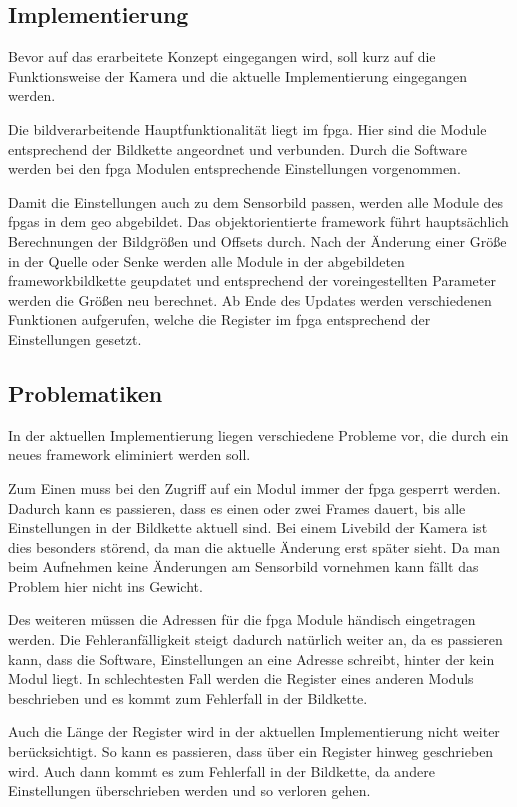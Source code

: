 \subsection{Implementierung}
Bevor auf das erarbeitete Konzept eingegangen wird, soll kurz auf die Funktionsweise der Kamera und die aktuelle Implementierung eingegangen werden.

Die bildverarbeitende Hauptfunktionalität liegt im \ac{fpga}. Hier sind die Module entsprechend der Bildkette angeordnet und verbunden. Durch die Software werden bei den \ac{fpga} Modulen entsprechende Einstellungen vorgenommen.

Damit die Einstellungen auch zu dem Sensorbild passen, werden alle Module des \ac{fpga}s in dem \ac{geo} abgebildet. Das objektorientierte \gls{framework} führt hauptsächlich Berechnungen der Bildgrößen und Offsets durch. Nach der Änderung einer Größe in der Quelle oder Senke werden alle Module in der abgebildeten \gls{framework}bildkette geupdatet und entsprechend der voreingestellten Parameter werden die Größen neu berechnet. Ab Ende des Updates werden verschiedenen Funktionen aufgerufen, welche die Register im \ac{fpga} entsprechend der Einstellungen gesetzt.


\subsection{Problematiken}\label{sec:prob}
In der aktuellen Implementierung liegen verschiedene Probleme vor, die durch ein neues \gls{framework} eliminiert werden soll.

Zum Einen muss bei den Zugriff auf ein Modul immer der \ac{fpga} gesperrt werden. Dadurch kann es passieren, dass es einen oder zwei Frames dauert, bis alle Einstellungen in der Bildkette aktuell sind. Bei einem Livebild der Kamera ist dies besonders störend, da man die aktuelle Änderung erst später sieht. Da man beim Aufnehmen keine Änderungen am Sensorbild vornehmen kann fällt das Problem hier nicht ins Gewicht.

Des weiteren müssen die Adressen für die \ac{fpga} Module händisch eingetragen werden. Die Fehleranfälligkeit steigt dadurch natürlich weiter an, da es passieren kann, dass die Software, Einstellungen an eine Adresse schreibt, hinter der kein Modul liegt. In schlechtesten Fall werden die Register eines anderen Moduls beschrieben und es kommt zum Fehlerfall in der Bildkette.

Auch die Länge der Register wird in der aktuellen Implementierung nicht weiter berücksichtigt. So kann es passieren, dass über ein Register hinweg geschrieben wird. Auch dann kommt es zum Fehlerfall in der Bildkette, da andere Einstellungen überschrieben werden und so verloren gehen. 

